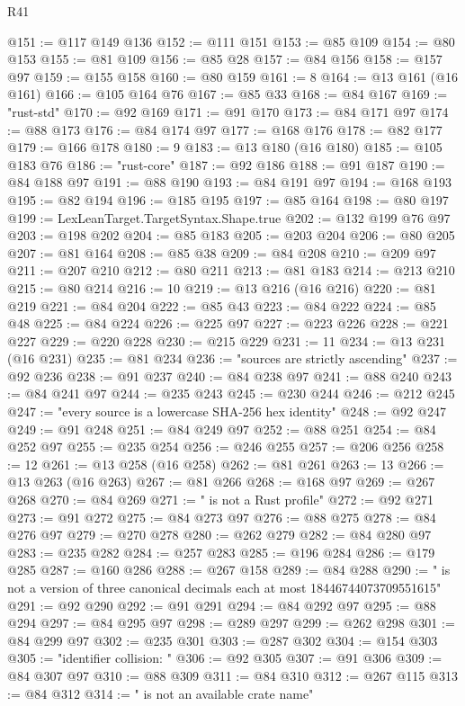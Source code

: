 \begin{lexlean}{R41}
\begin{coremodule}
@151 := @117 @149 @136
@152 := @111 @151
@153 := @85 @109
@154 := @80 @153
@155 := @81 @109
@156 := @85 @28
@157 := @84 @156
@158 := @157 @97
@159 := @155 @158
@160 := @80 @159
@161 := 8
@164 := @13 @161 (@16 @161)
@166 := @105 @164 @76
@167 := @85 @33
@168 := @84 @167
@169 := "rust-std"
@170 := @92 @169
@171 := @91 @170
@173 := @84 @171 @97
@174 := @88 @173
@176 := @84 @174 @97
@177 := @168 @176
@178 := @82 @177
@179 := @166 @178
@180 := 9
@183 := @13 @180 (@16 @180)
@185 := @105 @183 @76
@186 := "rust-core"
@187 := @92 @186
@188 := @91 @187
@190 := @84 @188 @97
@191 := @88 @190
@193 := @84 @191 @97
@194 := @168 @193
@195 := @82 @194
@196 := @185 @195
@197 := @85 @164
@198 := @80 @197
@199 := LexLeanTarget.TargetSyntax.Shape.true
@202 := @132 @199 @76 @97
@203 := @198 @202
@204 := @85 @183
@205 := @203 @204
@206 := @80 @205
@207 := @81 @164
@208 := @85 @38
@209 := @84 @208
@210 := @209 @97
@211 := @207 @210
@212 := @80 @211
@213 := @81 @183
@214 := @213 @210
@215 := @80 @214
@216 := 10
@219 := @13 @216 (@16 @216)
@220 := @81 @219
@221 := @84 @204
@222 := @85 @43
@223 := @84 @222
@224 := @85 @48
@225 := @84 @224
@226 := @225 @97
@227 := @223 @226
@228 := @221 @227
@229 := @220 @228
@230 := @215 @229
@231 := 11
@234 := @13 @231 (@16 @231)
@235 := @81 @234
@236 := "sources are strictly ascending"
@237 := @92 @236
@238 := @91 @237
@240 := @84 @238 @97
@241 := @88 @240
@243 := @84 @241 @97
@244 := @235 @243
@245 := @230 @244
@246 := @212 @245
@247 := "every source is a lowercase SHA-256 hex identity"
@248 := @92 @247
@249 := @91 @248
@251 := @84 @249 @97
@252 := @88 @251
@254 := @84 @252 @97
@255 := @235 @254
@256 := @246 @255
@257 := @206 @256
@258 := 12
@261 := @13 @258 (@16 @258)
@262 := @81 @261
@263 := 13
@266 := @13 @263 (@16 @263)
@267 := @81 @266
@268 := @168 @97
@269 := @267 @268
@270 := @84 @269
@271 := " is not a Rust profile"
@272 := @92 @271
@273 := @91 @272
@275 := @84 @273 @97
@276 := @88 @275
@278 := @84 @276 @97
@279 := @270 @278
@280 := @262 @279
@282 := @84 @280 @97
@283 := @235 @282
@284 := @257 @283
@285 := @196 @284
@286 := @179 @285
@287 := @160 @286
@288 := @267 @158
@289 := @84 @288
@290 := " is not a version of three canonical decimals each at most 18446744073709551615"
@291 := @92 @290
@292 := @91 @291
@294 := @84 @292 @97
@295 := @88 @294
@297 := @84 @295 @97
@298 := @289 @297
@299 := @262 @298
@301 := @84 @299 @97
@302 := @235 @301
@303 := @287 @302
@304 := @154 @303
@305 := "identifier collision: "
@306 := @92 @305
@307 := @91 @306
@309 := @84 @307 @97
@310 := @88 @309
@311 := @84 @310
@312 := @267 @115
@313 := @84 @312
@314 := " is not an available crate name"

\end{coremodule}
\end{lexlean}

